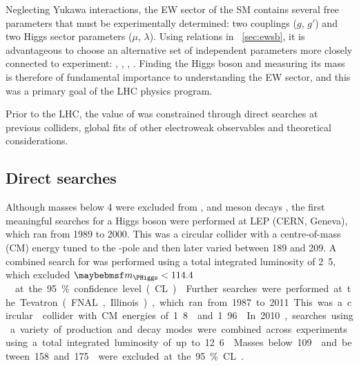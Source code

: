 
Neglecting Yukawa interactions, the EW sector of the SM contains several free 
parameters that must be experimentally determined: two couplings ($g$, $g'$) and two 
Higgs sector parameters ($\mu$, $\lambda$). Using relations in \Section~\ref{sec:ewsb}, 
it is advantageous to choose an alternative set of independent parameters more closely 
connected to experiment: \alphaEM, \mW, \mZ, \mH. Finding the Higgs boson and 
measuring its mass is therefore of fundamental importance to understanding the EW 
sector, and this was a primary goal of the LHC physics program.

Prior to the LHC, the value of \mH was constrained through direct searches at 
previous colliders, global fits of other electroweak observables and theoretical 
considerations.



\subsection{Direct searches}
\label{sec:prior_constraints:direct}

Although masses below \unit{4}{\GeV} were excluded from \PB, \PUpsilon and \PK meson 
decays \cite{PDG:1988}, the first meaningful searches for a Higgs boson were 
performed at LEP (CERN, Geneva), which ran from 1989 to 2000. This was a circular 
\epluseminus collider with a centre-of-mass (CM) energy tuned to the \PZ-pole and then 
later varied between 189 and \unit{209}{\GeV}. A combined search for \ZH was performed 
using a total integrated luminosity of \unit{2.5}{\invfb}, which excluded 
\unit{$\mH < 114.4$}{\GeV} at the 95\% confidence level (CL) \cite{LEP:2003}.

Further searches were performed at the Tevatron (FNAL, Illinois), which ran from 1987
to 2011. This was a circular \ppbar collider with CM energies of \unit{1.8}{\TeV}
and \unit{1.96}{\TeV}. In 2010, searches using a variety of production and decay modes 
were combined across experiments using a total integrated luminosity of up to
\unit{12.6}{\invfb}. Masses below \unit{109}{\GeV} and between 158 and \unit{175}{\GeV} 
were excluded at the 95\% CL \cite{Tevatron:2010}.




